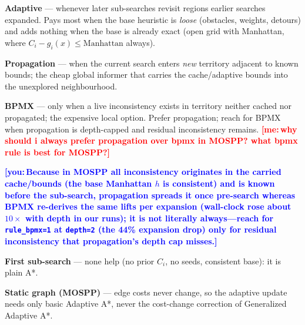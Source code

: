 \documentclass[11pt, a4paper]{article}
\newif\ifdraft\drafttrue
\newcommand{\me}[1]{%
    \ifdraft\textcolor{red}{\textbf{[me:\,#1]}}\fi%
}
\newcommand{\you}[1]{%
    \ifdraft\textcolor{blue}{\textbf{[you:\,#1]}}\fi%
}
\begin{document}
\begin{sentences}
\item \textbf{Adaptive} --- whenever later sub-searches revisit
      regions earlier searches expanded. Pays most when the base
      heuristic is \emph{loose} (obstacles, weights, detours)
      and adds nothing when the base is already exact (open grid
      with Manhattan, where $C_i - g_i(x) \le \text{Manhattan}$
      always).
\item \textbf{Propagation} --- when the current search enters
      \emph{new} territory adjacent to known bounds; the cheap
      global informer that carries the cache/adaptive bounds
      into the unexplored neighbourhood.
\item \textbf{BPMX} --- only when a live inconsistency exists in
      territory neither cached nor propagated; the expensive
      local option. Prefer propagation; reach for BPMX when
      propagation is depth-capped and residual inconsistency
      remains.
      \me{why should i always prefer propagation over bpmx in MOSPP? what bpmx rule is best for MOSPP?}
      \you{Because in MOSPP all inconsistency originates in the carried cache/bounds (the base Manhattan $h$ is consistent) and is known before the sub-search, propagation spreads it once pre-search whereas BPMX re-derives the same lifts per expansion (wall-clock rose about $10\times$ with depth in our runs); it is not literally always---reach for \texttt{rule\_bpmx=1} at \texttt{depth=2} (the 44\% expansion drop) only for residual inconsistency that propagation's depth cap misses.}
\item \textbf{First sub-search} --- none help (no prior $C_i$,
      no seeds, consistent base): it is plain A*.
\item \textbf{Static graph (MOSPP)} --- edge costs never change,
      so the adaptive update needs only basic Adaptive A*, never
      the cost-change correction of Generalized Adaptive A*.
\end{sentences}

\vspace{8pt}

\end{document}
